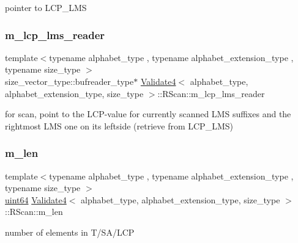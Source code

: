 pointer to L\+C\+P\+\_\+\+L\+MS 

\mbox{\label{struct_validate4_1_1_r_scan_aa712f18affa902ade5907584476a5003}} 
\subsubsection{\texorpdfstring{m\+\_\+lcp\+\_\+lms\+\_\+reader}{m\_lcp\_lms\_reader}}
{\footnotesize\ttfamily template$<$typename alphabet\+\_\+type , typename alphabet\+\_\+extension\+\_\+type , typename size\+\_\+type $>$ \\
size\+\_\+vector\+\_\+type\+::bufreader\+\_\+type$\ast$ \hyperlink{class_validate4}{Validate4}$<$ alphabet\+\_\+type, alphabet\+\_\+extension\+\_\+type, size\+\_\+type $>$\+::R\+Scan\+::m\+\_\+lcp\+\_\+lms\+\_\+reader\hspace{0.3cm}{\ttfamily [private]}}



for scan, point to the L\+C\+P-\/value for currently scanned L\+MS suffixes and the rightmost L\+MS one on its leftside (retrieve from L\+C\+P\+\_\+\+L\+MS) 

\mbox{\label{struct_validate4_1_1_r_scan_a4ba4d8371cdcc14a4a34b012ee27a7f8}} 
\subsubsection{\texorpdfstring{m\+\_\+len}{m\_len}}
{\footnotesize\ttfamily template$<$typename alphabet\+\_\+type , typename alphabet\+\_\+extension\+\_\+type , typename size\+\_\+type $>$ \\
\hyperlink{types_8h_a60e8696a4678cd348e991a1f172e53f7}{uint64} \hyperlink{class_validate4}{Validate4}$<$ alphabet\+\_\+type, alphabet\+\_\+extension\+\_\+type, size\+\_\+type $>$\+::R\+Scan\+::m\+\_\+len\hspace{0.3cm}{\ttfamily [private]}}



number of elements in T/\+S\+A/\+L\+CP 

